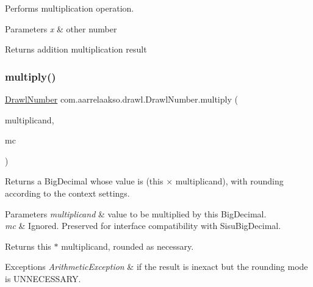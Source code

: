 Performs multiplication operation. 


\begin{DoxyParams}{Parameters}
{\em x} & other number \\
\hline
\end{DoxyParams}
\begin{DoxyReturn}{Returns}
addition multiplication result 
\end{DoxyReturn}
\mbox{\label{classcom_1_1aarrelaakso_1_1drawl_1_1_drawl_number_a70d594c3eaccb5b53b377dc9943913a8}} 
\subsubsection{\texorpdfstring{multiply()}{multiply()}\hspace{0.1cm}{\footnotesize\ttfamily [2/3]}}
{\footnotesize\ttfamily \hyperlink{classcom_1_1aarrelaakso_1_1drawl_1_1_drawl_number}{Drawl\+Number} com.\+aarrelaakso.\+drawl.\+Drawl\+Number.\+multiply (\begin{DoxyParamCaption}\item[{@Not\+Null \hyperlink{classcom_1_1aarrelaakso_1_1drawl_1_1_drawl_number}{Drawl\+Number}}]{multiplicand,  }\item[{Math\+Context}]{mc }\end{DoxyParamCaption})\hspace{0.3cm}{\ttfamily [protected]}}



Returns a Big\+Decimal whose value is (this × multiplicand), with rounding according to the context settings. 


\begin{DoxyParams}{Parameters}
{\em multiplicand} & value to be multiplied by this Big\+Decimal. \\
\hline
{\em mc} & Ignored. Preserved for interface compatibility with Sisu\+Big\+Decimal. \\
\hline
\end{DoxyParams}
\begin{DoxyReturn}{Returns}
this $\ast$ multiplicand, rounded as necessary. 
\end{DoxyReturn}

\begin{DoxyExceptions}{Exceptions}
{\em Arithmetic\+Exception} & if the result is inexact but the rounding mode is U\+N\+N\+E\+C\+E\+S\+S\+A\+RY. \\
\hline
\end{DoxyExceptions}
\mbox{\label{classcom_1_1aarrelaakso_1_1drawl_1_1_drawl_number_a8eb1872ac149fcad193f46fc8a6fa0ad}} 
